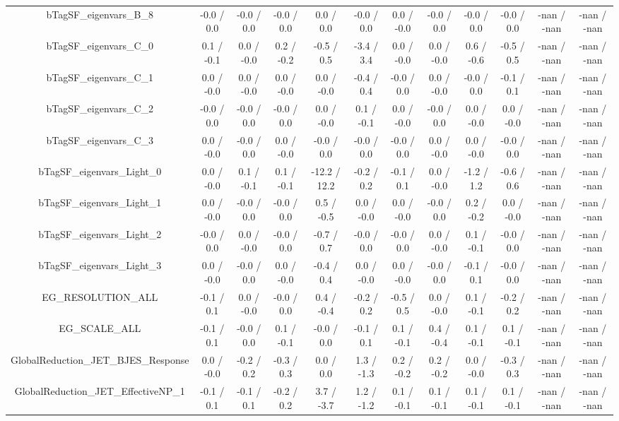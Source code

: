\begin{table}[htbp]
\begin{center}
\begin{tabular}{|c|c|c|c|c|c|c|c|c|c|c|c|}
  bTagSF_eigenvars_B_8 & -0.0 / 0.0 & -0.0 / 0.0 & -0.0 / 0.0 & 0.0 / 0.0 & -0.0 / 0.0 & 0.0 / -0.0 & -0.0 / 0.0 & -0.0 / 0.0 & -0.0 / 0.0 & -nan / -nan & -nan / -nan \\ 
  bTagSF_eigenvars_C_0 & 0.1 / -0.1 & 0.0 / -0.0 & 0.2 / -0.2 & -0.5 / 0.5 & -3.4 / 3.4 & 0.0 / -0.0 & 0.0 / -0.0 & 0.6 / -0.6 & -0.5 / 0.5 & -nan / -nan & -nan / -nan \\ 
  bTagSF_eigenvars_C_1 & 0.0 / -0.0 & 0.0 / -0.0 & 0.0 / -0.0 & 0.0 / -0.0 & -0.4 / 0.4 & -0.0 / 0.0 & 0.0 / -0.0 & -0.0 / 0.0 & -0.1 / 0.1 & -nan / -nan & -nan / -nan \\ 
  bTagSF_eigenvars_C_2 & -0.0 / 0.0 & -0.0 / 0.0 & -0.0 / 0.0 & 0.0 / -0.0 & 0.1 / -0.1 & 0.0 / -0.0 & -0.0 / 0.0 & 0.0 / -0.0 & 0.0 / -0.0 & -nan / -nan & -nan / -nan \\ 
  bTagSF_eigenvars_C_3 & 0.0 / -0.0 & -0.0 / 0.0 & 0.0 / -0.0 & -0.0 / 0.0 & -0.0 / 0.0 & -0.0 / 0.0 & 0.0 / -0.0 & 0.0 / -0.0 & -0.0 / 0.0 & -nan / -nan & -nan / -nan \\ 
  bTagSF_eigenvars_Light_0 & 0.0 / -0.0 & 0.1 / -0.1 & 0.1 / -0.1 & -12.2 / 12.2 & -0.2 / 0.2 & -0.1 / 0.1 & 0.0 / -0.0 & -1.2 / 1.2 & -0.6 / 0.6 & -nan / -nan & -nan / -nan \\ 
  bTagSF_eigenvars_Light_1 & 0.0 / -0.0 & -0.0 / 0.0 & -0.0 / 0.0 & 0.5 / -0.5 & 0.0 / -0.0 & 0.0 / -0.0 & -0.0 / 0.0 & 0.2 / -0.2 & 0.0 / -0.0 & -nan / -nan & -nan / -nan \\ 
  bTagSF_eigenvars_Light_2 & -0.0 / 0.0 & 0.0 / -0.0 & -0.0 / 0.0 & -0.7 / 0.7 & -0.0 / 0.0 & -0.0 / 0.0 & 0.0 / -0.0 & 0.1 / -0.1 & -0.0 / 0.0 & -nan / -nan & -nan / -nan \\ 
  bTagSF_eigenvars_Light_3 & 0.0 / -0.0 & -0.0 / 0.0 & 0.0 / -0.0 & -0.4 / 0.4 & 0.0 / -0.0 & 0.0 / -0.0 & -0.0 / 0.0 & -0.1 / 0.1 & -0.0 / 0.0 & -nan / -nan & -nan / -nan \\ 
  EG_RESOLUTION_ALL & -0.1 / 0.1 & 0.0 / -0.0 & -0.0 / 0.0 & 0.4 / -0.4 & -0.2 / 0.2 & -0.5 / 0.5 & 0.0 / -0.0 & 0.1 / -0.1 & -0.2 / 0.2 & -nan / -nan & -nan / -nan \\ 
  EG_SCALE_ALL & -0.1 / 0.1 & -0.0 / 0.0 & 0.1 / -0.1 & -0.0 / 0.0 & -0.1 / 0.1 & 0.1 / -0.1 & 0.4 / -0.4 & 0.1 / -0.1 & 0.1 / -0.1 & -nan / -nan & -nan / -nan \\ 
  GlobalReduction_JET_BJES_Response & 0.0 / -0.0 & -0.2 / 0.2 & -0.3 / 0.3 & 0.0 / 0.0 & 1.3 / -1.3 & 0.2 / -0.2 & 0.2 / -0.2 & 0.0 / -0.0 & -0.3 / 0.3 & -nan / -nan & -nan / -nan \\ 
  GlobalReduction_JET_EffectiveNP_1 & -0.1 / 0.1 & -0.1 / 0.1 & -0.2 / 0.2 & 3.7 / -3.7 & 1.2 / -1.2 & 0.1 / -0.1 & 0.1 / -0.1 & 0.1 / -0.1 & 0.1 / -0.1 & -nan / -nan & -nan / -nan \\ 

\end{tabular}
\end{center}
\end{table}
